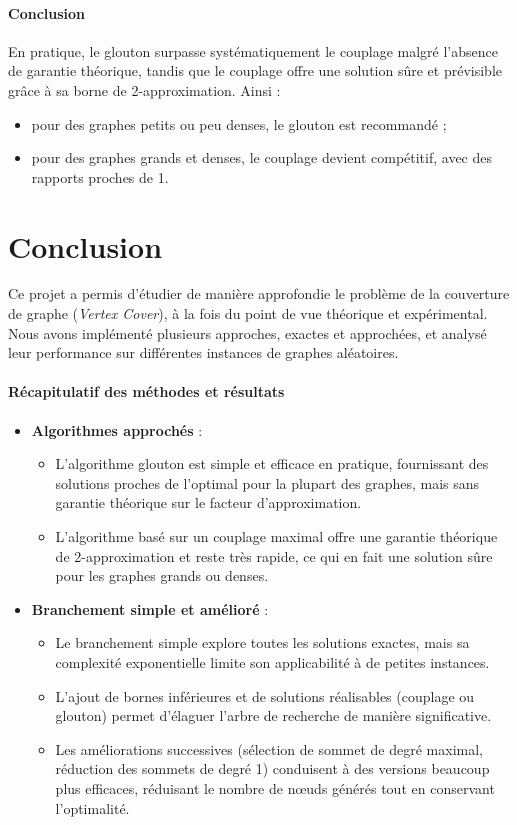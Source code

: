 \documentclass[11pt,a4paper]{article}
\begin{document}
\paragraph{Conclusion}
En pratique, le glouton surpasse systématiquement le couplage malgré l’absence de garantie théorique, tandis que le couplage offre une solution sûre et prévisible grâce à sa borne de 2-approximation.  
Ainsi :
\begin{itemize}
  \item pour des graphes petits ou peu denses, le glouton est recommandé ;
  \item pour des graphes grands et denses, le couplage devient compétitif, avec des rapports proches de 1.
\end{itemize}

\section{Conclusion}

Ce projet a permis d’étudier de manière approfondie le problème de la couverture de graphe (\textit{Vertex Cover}), à la fois du point de vue théorique et expérimental. Nous avons implémenté plusieurs approches, exactes et approchées, et analysé leur performance sur différentes instances de graphes aléatoires.

\paragraph{Récapitulatif des méthodes et résultats}
\begin{itemize}
    \item \textbf{Algorithmes approchés} : 
    \begin{itemize}
        \item L’algorithme glouton est simple et efficace en pratique, fournissant des solutions proches de l’optimal pour la plupart des graphes, mais sans garantie théorique sur le facteur d’approximation.
        \item L’algorithme basé sur un couplage maximal offre une garantie théorique de 2-approximation et reste très rapide, ce qui en fait une solution sûre pour les graphes grands ou denses.
    \end{itemize}
    \item \textbf{Branchement simple et amélioré} : 
    \begin{itemize}
        \item Le branchement simple explore toutes les solutions exactes, mais sa complexité exponentielle limite son applicabilité à de petites instances.
        \item L’ajout de bornes inférieures et de solutions réalisables (couplage ou glouton) permet d’élaguer l’arbre de recherche de manière significative.
        \item Les améliorations successives (sélection de sommet de degré maximal, réduction des sommets de degré 1) conduisent à des versions beaucoup plus efficaces, réduisant le nombre de nœuds générés tout en conservant l’optimalité.
    \end{itemize}
\end{itemize}
\end{document}
